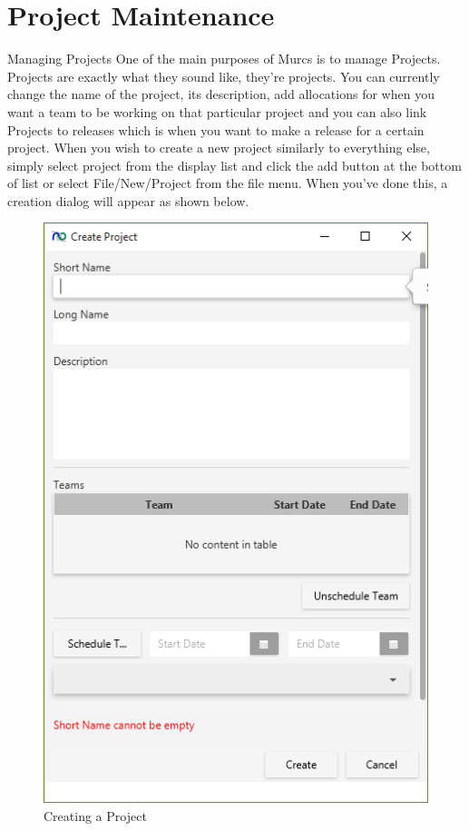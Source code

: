 \section{Project Maintenance}

Managing Projects
\newline\newline
One of the main purposes of Murcs is to manage Projects. Projects are exactly what they sound like, they're projects. You can currently change the name of the project, its description, add allocations for when you want a team to be working on that particular project and you can also link Projects to releases which is when you want to make a release for a certain project.
\newline
When you wish to create a new project similarly to everything else, simply select project from the display list and click the add button at the bottom of list or select File/New/Project from the file menu. When you've done this, a creation dialog will appear as shown below.

\begin{figure}[H]
\centering
\includegraphics[width=\textwidth]{images/screenshots/projects1.PNG}
\caption{Creating a Project}
\label{fig:new_project}
\end{figure}

